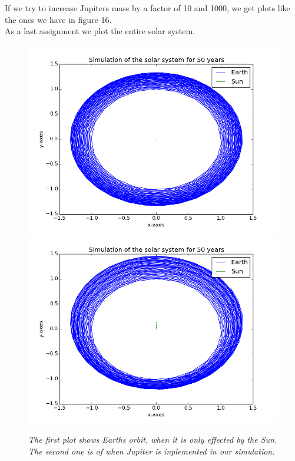 \documentclass[a4paper,12pt, english]{article}
\begin{document}
If we try to increase Jupiters mass by a factor of 10 and 1000, we get plots like the ones we have in figure 16. \\

As a last assignment we plot the entire solar system. \\

\begin{figure}[h!]
  \centering
   	 \includegraphics[scale=0.4]{Sun_earth.png}\includegraphics[scale=0.4]{Earth_sun_jupiter.png}
  \caption{\textit{The first plot shows Earths orbit, when it is only effected by the Sun. The second one is of when Jupiter is inplemented in our simulation.}}
\end{figure}
\end{document}
